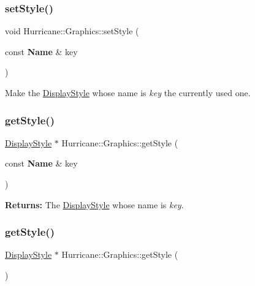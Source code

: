 \subsubsection{\texorpdfstring{set\+Style()}{setStyle()}}
{\footnotesize\ttfamily void Hurricane\+::\+Graphics\+::set\+Style (\begin{DoxyParamCaption}\item[{const \textbf{ Name} \&}]{key }\end{DoxyParamCaption})\hspace{0.3cm}{\ttfamily [static]}}

Make the \hyperlink{classHurricane_1_1DisplayStyle}{Display\+Style} whose name is {\itshape key} the currently used one. \mbox{\label{classHurricane_1_1Graphics_a2506213ff4c28b22d356e7bfbb242ed6}} 
\subsubsection{\texorpdfstring{get\+Style()}{getStyle()}\hspace{0.1cm}{\footnotesize\ttfamily [1/2]}}
{\footnotesize\ttfamily \hyperlink{classHurricane_1_1DisplayStyle}{Display\+Style} $\ast$ Hurricane\+::\+Graphics\+::get\+Style (\begin{DoxyParamCaption}\item[{const \textbf{ Name} \&}]{key }\end{DoxyParamCaption})\hspace{0.3cm}{\ttfamily [static]}}

{\bfseries Returns\+:} The \hyperlink{classHurricane_1_1DisplayStyle}{Display\+Style} whose name is {\itshape key}. \mbox{\label{classHurricane_1_1Graphics_aef89b1aa2be83b61ae0838a219d2b696}} 
\subsubsection{\texorpdfstring{get\+Style()}{getStyle()}\hspace{0.1cm}{\footnotesize\ttfamily [2/2]}}
{\footnotesize\ttfamily \hyperlink{classHurricane_1_1DisplayStyle}{Display\+Style} $\ast$ Hurricane\+::\+Graphics\+::get\+Style (\begin{DoxyParamCaption}{ }\end{DoxyParamCaption})\hspace{0.3cm}{\ttfamily [static]}}

